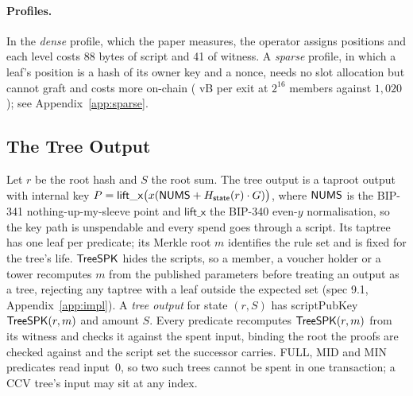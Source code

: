 \paragraph{Profiles.} In the \emph{dense} profile, which the paper
measures, the operator assigns positions and each level costs 88 bytes of
script and 41 of witness. A \emph{sparse} profile, in which a leaf's
position is a hash of its owner key and a nonce, needs no slot allocation
but cannot graft and costs more on-chain (\sparseExitBig{} vB per exit at
$2^{16}$ members against $1{,}020$); see Appendix~\ref{app:sparse}.

\subsection{The Tree Output}\label{sec:output}

Let $r$ be the root hash and $S$ the root sum. The tree output is a
taproot output with internal key
$P = \mathsf{lift\_x}\bigl(x(\mathsf{NUMS} + H_{\mathsf{state}}(r)\cdot G)\bigr)$, where
$\mathsf{NUMS}$ is the BIP-341 nothing-up-my-sleeve point and $\mathsf{lift\_x}$
the BIP-340 even-$y$ normalisation, so the key path is unspendable and
every spend goes through a script. Its taptree has one leaf per
predicate; its Merkle root $m$ identifies the rule set and is fixed for
the tree's life. $\mathsf{TreeSPK}$ hides the scripts, so a member, a voucher
holder or a tower recomputes $m$ from the published parameters before
treating an output as a tree, rejecting any taptree with a leaf outside
the expected set (spec 9.1\iffullversion\else, Appendix~\ref{app:impl}\fi). A \emph{tree output} for state $(r, S)$ has scriptPubKey
$\mathsf{TreeSPK}(r, m)$ and amount $S$. Every predicate recomputes
$\mathsf{TreeSPK}(r, m)$ from its witness and checks it against the spent input,
binding the root the proofs are checked against and the script set the
successor carries. FULL, MID and MIN predicates read input~0, so two such
trees cannot be spent in one transaction; a CCV tree's input may sit at
any index.

